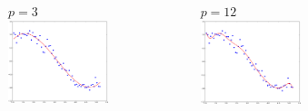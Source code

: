 \documentclass[handout, 10pt]{beamer}
\begin{document}
\begin{frame}
\begin{columns}
\begin{figure}
\end{figure}
\vspace{-2em}
\begin{figure}
$p=3$
\includegraphics[width=0.99\textwidth]{./linreg_pow3.png}
\end{figure}
\vspace{-2em}
\begin{figure}
$p=12$
\includegraphics[width=0.99\textwidth]{./linreg_pow12.png}
\end{figure}
\vspace{-2em}

\end{columns}
\end{frame}
\end{document}
